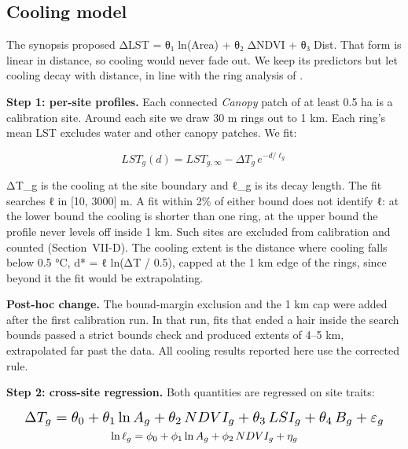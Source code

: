 \documentclass[conference]{IEEEtran}
\begin{document}
\subsection{Cooling model}\label{cooling-model}

The synopsis proposed ΔLST = θ₁ ln(Area) + θ₂ ΔNDVI + θ₃ Dist. That form
is linear in distance, so cooling would never fade out. We keep its
predictors but let cooling decay with distance, in line with the ring
analysis of \cite{b3}.

\textbf{Step 1: per-site profiles.} Each connected \emph{Canopy} patch
of at least 0.5 ha is a calibration site. Around each site we draw 30 m
rings out to 1 km. Each ring's mean LST excludes water and other canopy
patches. We fit:

\begin{equation}
LST_g(d) = LST_{g,\infty} - \Delta T_g \, e^{-d/\ell_g}
\end{equation}

ΔT\_g is the cooling at the site boundary and ℓ\_g is its decay length.
The fit searches ℓ in {[}10, 3000{]} m. A fit within 2\% of either bound
does not identify ℓ: at the lower bound the cooling is shorter than one
ring, at the upper bound the profile never levels off inside 1 km. Such
sites are excluded from calibration and counted (Section~VII-D). The
cooling extent is the distance where cooling falls below 0.5 °C, d* = ℓ
ln(ΔT / 0.5), capped at the 1 km edge of the rings, since beyond it the
fit would be extrapolating.

\textbf{Post-hoc change.} The bound-margin exclusion and the 1 km cap
were added after the first calibration run. In that run, fits that ended
a hair inside the search bounds passed a strict bounds check and
produced extents of 4--5 km, extrapolated far past the data. All cooling
results reported here use the corrected rule.

\textbf{Step 2: cross-site regression.} Both quantities are regressed on
site traits:

\begin{equation}
\begin{gathered}
\resizebox{0.95\columnwidth}{!}{$\displaystyle \Delta T_g = \theta_0 + \theta_1 \ln A_g + \theta_2 \, NDVI_g + \theta_3 \, LSI_g + \theta_4 \, B_g + \varepsilon_g$} \\
\ln \ell_g = \phi_0 + \phi_1 \ln A_g + \phi_2 \, NDVI_g + \eta_g
\end{gathered}
\end{equation}
\end{document}
